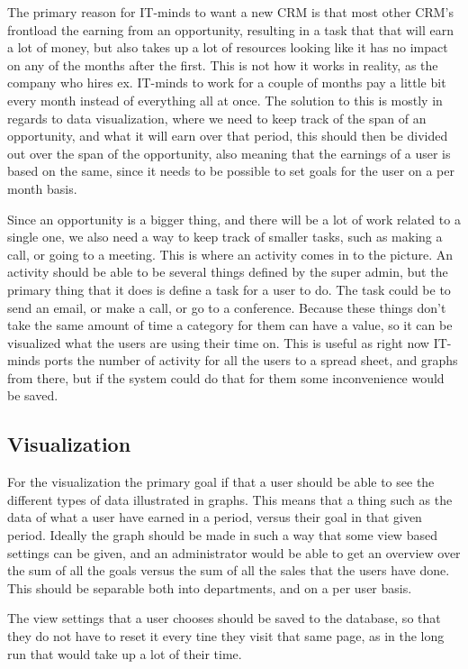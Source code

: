 The primary reason for IT-minds to want a new CRM is that most other CRM's frontload the earning from an opportunity, resulting in a task that that will earn a lot of money, but also takes up a lot of resources looking like it has no impact on any of the months after the first. This is not how it works in reality, as the company who hires ex. IT-minds to work for a couple of months pay a little bit every month instead of everything all at once. The solution to this is mostly in regards to data visualization, where we need to keep track of the span of an opportunity, and what it will earn over that period, this should then be divided out over the span of the opportunity, also meaning that the earnings of a user is based on the same, since it needs to be possible to set goals for the user on a per month basis.

Since an opportunity is a bigger thing, and there will be a lot of work related to a single one, we also need a way to keep track of smaller tasks, such as making a call, or going to a meeting. This is where an activity comes in to the picture. An activity should be able to be several things defined by the super admin, but the primary thing that it does is define a task for a user to do. The task could be to send an email, or make a call, or go to a conference. Because these things don't take the same amount of time a category for them can have a value, so it can be visualized what the users are using their time on. This is useful as right now IT-minds ports the number of activity for all the users to a spread sheet, and graphs from there, but if the system could do that for them some inconvenience would be saved.

\subsection{Visualization}
\label{sub:Visualization}
For the visualization the primary goal if that a user should be able to see the different types of data illustrated in graphs. This means that a thing such as the data of what a user have earned in a period, versus their goal in that given period. Ideally the graph should be made in such a way that some view based settings can be given, and an administrator would be able to get an overview over the sum of all the goals versus the sum of all the sales that the users have done. This should be separable both into departments, and on a per user basis.

The view settings that a user chooses should be saved to the database, so that they do not have to reset it every tine they visit that same page, as in the long run that would take up a lot of their time.

